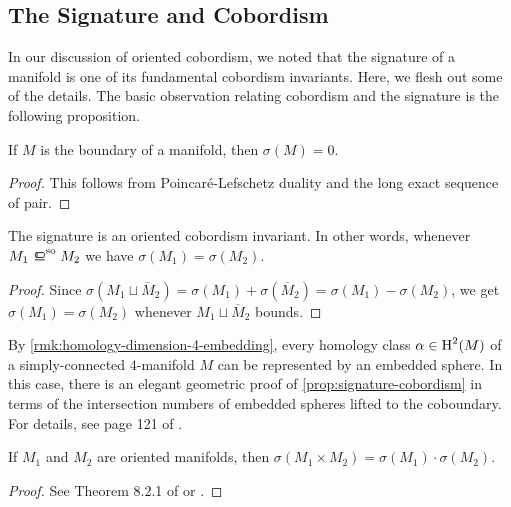 
\subsection{The Signature and Cobordism}\label{sec:signature-and-cobordism}

In our discussion of oriented cobordism, we noted that the signature of a manifold is one of its fundamental cobordism invariants. Here, we flesh out some of the details. The basic observation relating cobordism and the signature is the following proposition.

\begin{proposition}\label{prop:signature-cobordism}
	If $M$ is the boundary of a manifold, then $\sigma(M)=0$.
\end{proposition}
\begin{proof}
	This follows from Poincar\'e-Lefschetz duality and the long exact sequence of pair.
\end{proof}

\begin{corollary}
	The signature is an oriented cobordism invariant. In other words, whenever $M_1\sobord M_2$ we have $\sigma(M_1)=\sigma(M_2)$.
\end{corollary}
\begin{proof}
Since $\sigma(M_1\sqcup\overline{M}_2)=\sigma(M_1)+\sigma(\overline{M}_2)=\sigma(M_1)-\sigma(M_2)$, we get $\sigma(M_1)=\sigma(M_2)$ whenever $M_1\sqcup \overline{M}_2$ bounds.
\end{proof}

\begin{remark*}
	By \cref{rmk:homology-dimension-4-embedding}, every homology class $\alpha\in \operatorname{H}^2(M)$ of a simply-connected $4$-manifold $M$ can be represented by an embedded sphere. In this case, there is an elegant geometric proof of \cref{prop:signature-cobordism} in terms of the intersection numbers of embedded spheres lifted to the coboundary. For details, see page 121 of \cite{scorpan2005wild}.
\end{remark*}

\begin{proposition}
	If $M_1$ and $M_2$ are oriented manifolds, then $\sigma(M_1\times M_2)=\sigma(M_1)\cdot \sigma(M_2)$.
\end{proposition}

\begin{proof}
	See Theorem 8.2.1 of \cite{hirzebruch1966methods} or \cite{chernhirzserre1957index}.
\end{proof}

